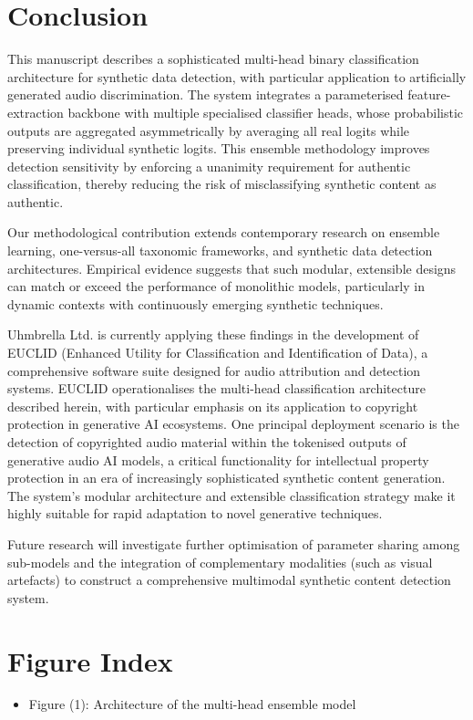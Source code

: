 \documentclass[conference]{IEEEtran}  %
\begin{document}
\section{Conclusion}
This manuscript describes a sophisticated multi-head binary classification architecture for synthetic data detection, with particular application to artificially generated audio discrimination. The system integrates a parameterised feature-extraction backbone with multiple specialised classifier heads, whose probabilistic outputs are aggregated asymmetrically by averaging all real logits while preserving individual synthetic logits. This ensemble methodology improves detection sensitivity by enforcing a unanimity requirement for authentic classification, thereby reducing the risk of misclassifying synthetic content as authentic.

Our methodological contribution extends contemporary research on ensemble learning, one-versus-all taxonomic frameworks, and synthetic data detection architectures. Empirical evidence suggests that such modular, extensible designs can match or exceed the performance of monolithic models, particularly in dynamic contexts with continuously emerging synthetic techniques.

Uhmbrella Ltd. is currently applying these findings in the development of EUCLID (Enhanced Utility for Classification and Identification of Data), a comprehensive software suite designed for audio attribution and detection systems. EUCLID operationalises the multi-head classification architecture described herein, with particular emphasis on its application to copyright protection in generative AI ecosystems. One principal deployment scenario is the detection of copyrighted audio material within the tokenised outputs of generative audio AI models, a critical functionality for intellectual property protection in an era of increasingly sophisticated synthetic content generation. The system's modular architecture and extensible classification strategy make it highly suitable for rapid adaptation to novel generative techniques.

Future research will investigate further optimisation of parameter sharing among sub-models and the integration of complementary modalities (such as visual artefacts) to construct a comprehensive multimodal synthetic content detection system.




\section*{Figure Index}
\begin{itemize}
    \item Figure (1): Architecture of the multi-head ensemble model
\end{itemize}
\end{document}
